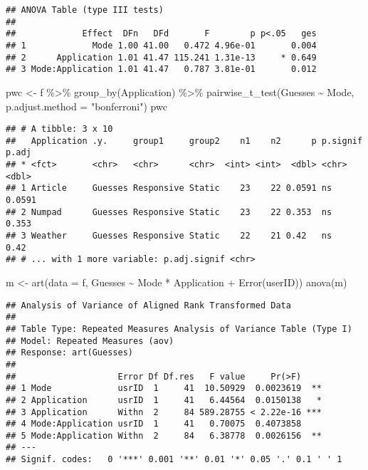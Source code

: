 \documentclass[
]{article}
\newenvironment{Shaded}{\begin{snugshade}}{\end{snugshade}}
\newcommand{\AttributeTok}[1]{\textcolor[rgb]{0.77,0.63,0.00}{#1}}
\newcommand{\FunctionTok}[1]{\textcolor[rgb]{0.00,0.00,0.00}{#1}}
\newcommand{\NormalTok}[1]{#1}
\newcommand{\OtherTok}[1]{\textcolor[rgb]{0.56,0.35,0.01}{#1}}
\newcommand{\SpecialCharTok}[1]{\textcolor[rgb]{0.00,0.00,0.00}{#1}}
\newcommand{\StringTok}[1]{\textcolor[rgb]{0.31,0.60,0.02}{#1}}
\begin{document}
\begin{verbatim}
## ANOVA Table (type III tests)
## 
##             Effect  DFn   DFd       F        p p<.05   ges
## 1             Mode 1.00 41.00   0.472 4.96e-01       0.004
## 2      Application 1.01 41.47 115.241 1.31e-13     * 0.649
## 3 Mode:Application 1.01 41.47   0.787 3.81e-01       0.012
\end{verbatim}

\begin{Shaded}
\begin{Highlighting}[]
\NormalTok{pwc }\OtherTok{\textless{}{-}}\NormalTok{ f }\SpecialCharTok{\%\textgreater{}\%} \FunctionTok{group\_by}\NormalTok{(Application) }\SpecialCharTok{\%\textgreater{}\%} \FunctionTok{pairwise\_t\_test}\NormalTok{(Guesses }\SpecialCharTok{\textasciitilde{}}\NormalTok{ Mode, }\AttributeTok{p.adjust.method =} \StringTok{"bonferroni"}\NormalTok{)}
\NormalTok{pwc}
\end{Highlighting}
\end{Shaded}

\begin{verbatim}
## # A tibble: 3 x 10
##   Application .y.     group1     group2    n1    n2      p p.signif  p.adj
## * <fct>       <chr>   <chr>      <chr>  <int> <int>  <dbl> <chr>     <dbl>
## 1 Article     Guesses Responsive Static    23    22 0.0591 ns       0.0591
## 2 Numpad      Guesses Responsive Static    23    22 0.353  ns       0.353 
## 3 Weather     Guesses Responsive Static    22    21 0.42   ns       0.42  
## # ... with 1 more variable: p.adj.signif <chr>
\end{verbatim}

\begin{Shaded}
\begin{Highlighting}[]
\NormalTok{m }\OtherTok{\textless{}{-}} \FunctionTok{art}\NormalTok{(}\AttributeTok{data =}\NormalTok{ f, Guesses }\SpecialCharTok{\textasciitilde{}}\NormalTok{ Mode }\SpecialCharTok{*}\NormalTok{ Application }\SpecialCharTok{+} \FunctionTok{Error}\NormalTok{(userID))}
\FunctionTok{anova}\NormalTok{(m)}
\end{Highlighting}
\end{Shaded}

\begin{verbatim}
## Analysis of Variance of Aligned Rank Transformed Data
## 
## Table Type: Repeated Measures Analysis of Variance Table (Type I) 
## Model: Repeated Measures (aov)
## Response: art(Guesses)
## 
##                    Error Df Df.res   F value     Pr(>F)    
## 1 Mode             usrID  1     41  10.50929  0.0023619  **
## 2 Application      usrID  1     41   6.44564  0.0150138   *
## 3 Application      Withn  2     84 589.28755 < 2.22e-16 ***
## 4 Mode:Application usrID  1     41   0.70075  0.4073858    
## 5 Mode:Application Withn  2     84   6.38778  0.0026156  **
## ---
## Signif. codes:   0 '***' 0.001 '**' 0.01 '*' 0.05 '.' 0.1 ' ' 1
\end{verbatim}
\end{document}
